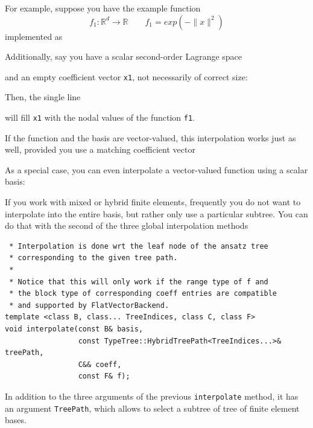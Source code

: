 \documentclass[a4paper,10pt,headings=normal,bibliography=totoc]{scrartcl}
\newcommand{\cpp}[1]{\lstinline[basicstyle=\ttfamily]!#1!}
\newcommand{\R}{\mathbb{R}}
\newcommand{\norm}[1]{\lVert#1\rVert}
\begin{document}
For example, suppose you have the example function
\begin{equation*}
 f_1 : \R^d \to \R
 \qquad
 f_1 = exp(-\norm{x}^2)
\end{equation*}
implemented as
%

%
Additionally, say you have a scalar second-order Lagrange space
%

%
and an empty coefficient vector \cpp{x1}, not necessarily of correct size:
%

%
Then, the single line
%

%
will fill \cpp{x1} with the nodal values of the function \cpp{f1}.

If the function and the basis are vector-valued, this interpolation works just as well, provided you use
a matching coefficient vector
%

%
As a special case, you can even interpolate a vector-valued function using a scalar basis:
%

%

If you work with mixed or hybrid finite elements, frequently you do not want to interpolate into
the entire basis, but rather only use a particular subtree.  You can do that with the second of the
three global interpolation methods
\begin{lstlisting}
 * Interpolation is done wrt the leaf node of the ansatz tree
 * corresponding to the given tree path.
 *
 * Notice that this will only work if the range type of f and
 * the block type of corresponding coeff entries are compatible
 * and supported by FlatVectorBackend.
template <class B, class... TreeIndices, class C, class F>
void interpolate(const B& basis,
                 const TypeTree::HybridTreePath<TreeIndices...>& treePath,
                 C&& coeff,
                 const F& f);
\end{lstlisting}
In addition to the three arguments of the previous \cpp{interpolate} method, it has an argument \cpp{TreePath},
which allows to select a subtree of tree of finite element bases.
\end{document}
